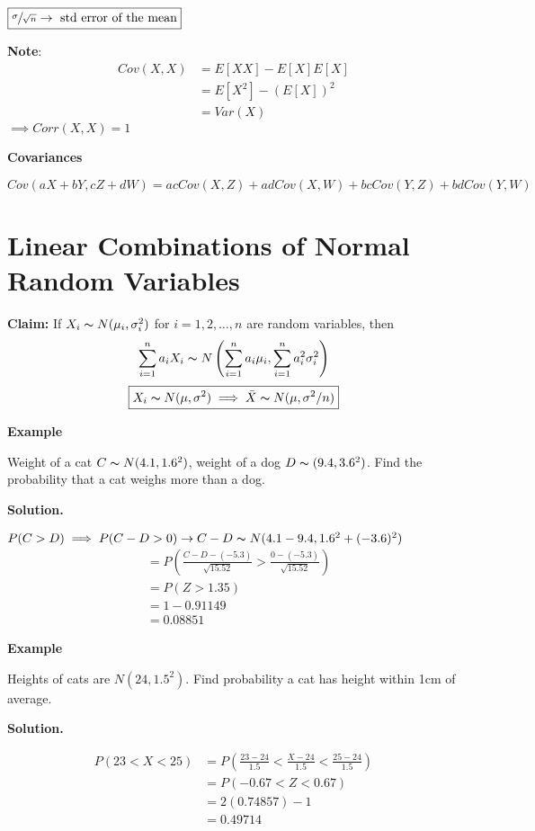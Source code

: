 $\boxed{\sfrac{\sigma}{\sqrt{n}}\rightarrow\text{ std error of the mean}}$

\textbf{Note}:
\begin{align*}
    Cov(X,X)
     & =E[XX]-E[X]E[X]  \\
     & =E[X^2]-(E[X])^2 \\
     & =Var(X)
\end{align*}
$ \implies Corr(X,X)=1 $

\textbf{Covariances}

\[ Cov(aX+bY,cZ+dW)=acCov(X,Z)+adCov(X,W)+bcCov(Y,Z)+bdCov(Y,W) \]

\section{Linear Combinations of Normal Random Variables}
\textbf{Claim:}
If $ X_i \thicksim N(\mu_i,\sigma_i^2) $ for $ i=1,2,\ldots ,n $
are random variables, then
\[ \sum\limits_{i=1}^{n} a_i X_i \thicksim
    N\left(\sum\limits_{i=1}^{n}a_i\mu_i,\sum\limits_{i=1}^{n} a_i^2\sigma_i^2\right) \]
\[ \boxed{X_i \thicksim N(\mu,\sigma^2)\implies\bar{X} \thicksim N(\mu,\sigma^2/n)} \]

\textbf{Example}

Weight of a cat $ C \thicksim N(4.1,1.6^2) $, weight of a dog
$ D \thicksim (9.4,3.6^2) $. Find the probability that a cat weighs more than
a dog.

\textbf{Solution.}

$ P(C>D)\implies P(C-D>0)\rightarrow C-D \thicksim N(4.1-9.4,1.6^2+(-3.6)^2)$
\begin{align*}
     & =P\left(\frac{C-D-(-5.3)}{\sqrt{15.52}}>\frac{0-(-5.3)}{\sqrt{15.52}}\right) \\
     & =P(Z>1.35)                                                                   \\
     & =1-0.91149                                                                   \\
     & =0.08851
\end{align*}

\textbf{Example}

Heights of cats are $ N(24,1.5^2) $. Find probability a cat has height
within 1cm of average.

\textbf{Solution.}

\begin{align*}
    P(23<X<25) & =
    P\left( \frac{23-24}{1.5}<\frac{X-24}{1.5}<\frac{25-24}{1.5} \right) \\
               & =P(-0.67<Z<0.67)                                        \\
               & =2(0.74857)-1                                           \\
               & =0.49714
\end{align*}

